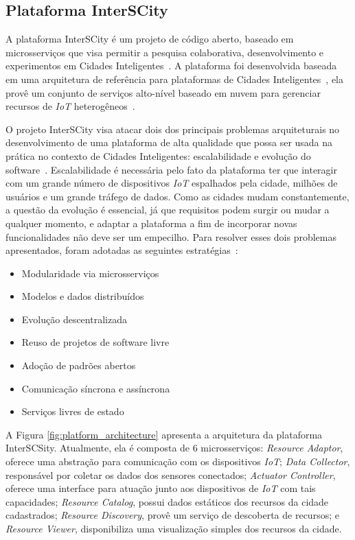 \subsection{Plataforma InterSCity}
\label{sec:interscity}

A plataforma InterSCity é um projeto de código aberto, baseado em microsserviços que visa permitir a pesquisa colaborativa, desenvolvimento e experimentos em Cidades
Inteligentes~\cite{arthur_17}.
A plataforma foi desenvolvida baseada em uma arquitetura de referência para plataformas de Cidades Inteligentes~\cite{santana_2016}, ela provê um conjunto de serviços
alto-nível baseado em nuvem para gerenciar recursos de \textit{IoT} heterogêneos~\cite{arthur_17}.

O projeto InterSCity visa atacar dois dos principais problemas arquiteturais no desenvolvimento de uma plataforma de alta qualidade que possa ser usada na prática no
contexto de Cidades Inteligentes: escalabilidade e evolução do software~\cite{arthur_17}.
Escalabilidade é necessária pelo fato da plataforma ter que interagir com um grande número de dispositivos \textit{IoT} espalhados pela cidade, milhões de usuários e
um grande tráfego de dados.
Como as cidades mudam constantemente, a questão da evolução é essencial, já que requisitos podem surgir ou mudar a qualquer momento, e adaptar a plataforma a fim de
incorporar novas funcionalidades não deve ser um empecilho.
Para resolver esses dois problemas apresentados, foram adotadas as seguintes estratégias~\cite{arthur_17}:

\begin{itemize}
	\item Modularidade via microsserviços
	\item Modelos e dados distribuídos
	\item Evolução descentralizada
	\item Reuso de projetos de software livre
	\item Adoção de padrões abertos
	\item Comunicação síncrona e assíncrona
	\item Serviços livres de estado
\end{itemize}

A Figura \ref{fig:platform_architecture} apresenta a arquitetura da plataforma InterSCSity.
Atualmente, ela é composta de 6 microsserviços:
\textit{Resource Adaptor}, oferece uma abstração para comunicação com os dispositivos \textit{IoT};
\textit{Data Collector}, responsável por coletar os dados dos sensores conectados;
\textit{Actuator Controller}, oferece uma interface para atuação junto aos dispositivos de \textit{IoT} com tais capacidades;
\textit{Resource Catalog}, possui dados estáticos dos recursos da cidade cadastrados;
\textit{Resource Discovery}, provê um serviço de descoberta de recursos;
e \textit{Resource Viewer}, disponibiliza uma visualização simples dos recursos da cidade. 

